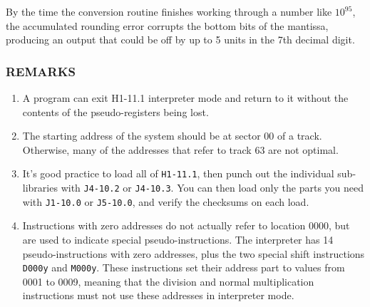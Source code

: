 By the time the conversion routine finishes working through a number like $10^{95}$, the accumulated rounding error corrupts the bottom bits of the mantissa, producing an output that could be off by up to 5 units in the 7th decimal digit.

\subsubsection*{REMARKS}

\begin{enumerate}
\item A program can exit H1-11.1 interpreter mode and return to it without the contents of the pseudo-registers being lost.
\item The starting address of the system should be at sector 00 of a track. Otherwise, many of the addresses that refer to track 63 are not optimal.
\item It's good practice to load all of \texttt{H1-11.1}, then punch out the individual sub-libraries with \texttt{J4-10.2} or \texttt{J4-10.3}. You can then load only the parts you need with \texttt{J1-10.0} or \texttt{J5-10.0}, and verify the checksums on each load.
\item Instructions with zero addresses do not actually refer to location 0000, but are used to indicate special pseudo-instructions. The interpreter has 14 pseudo-instructions with zero addresses, plus the two special shift instructions \texttt{D000y} and \texttt{M000y}. These instructions set their address part to values from 0001 to 0009, meaning that the division and normal multiplication instructions must not use these addresses in interpreter mode.
\end{enumerate}

